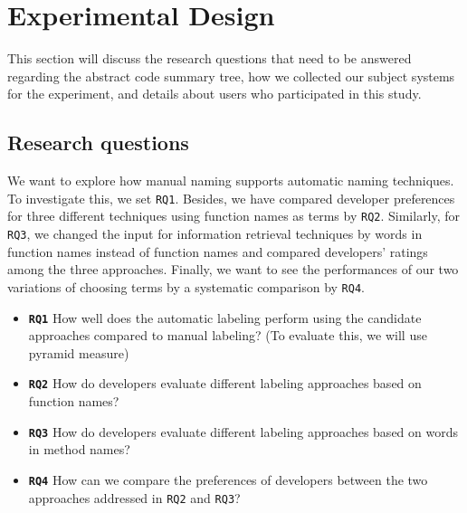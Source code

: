 \section{Experimental Design}
\label{Experimental}
This section will discuss the research questions that need to be answered regarding the abstract code summary tree, how we collected our subject systems for the experiment, and details about users who participated in this study.


\subsection{Research questions}
We want to explore how manual naming supports automatic naming techniques. To investigate this, we set \texttt{RQ1}.
Besides, we have compared developer preferences for three different techniques using function names as terms by \texttt{RQ2}. Similarly, for \texttt{RQ3}, we changed the input for information retrieval techniques by words in function names instead of function names and compared developers' ratings among the three approaches. Finally, we want to see the performances of our two variations of choosing terms by a systematic comparison by \texttt{RQ4}. 



\begin{itemize}
    \item \textbf{\texttt{RQ1}} How well does the automatic labeling perform using the candidate approaches compared to manual labeling?  (To evaluate this, we will use pyramid measure)
    \item \textbf{\texttt{RQ2}} How do developers evaluate different labeling approaches based on function names?
    \item \textbf{\texttt{RQ3}} How do developers evaluate different labeling approaches based on words in method names? 
    \item \textbf{\texttt{RQ4}} How can we compare the preferences of developers between the two approaches addressed in \texttt{RQ2} and \texttt{RQ3}? 
\end{itemize}



